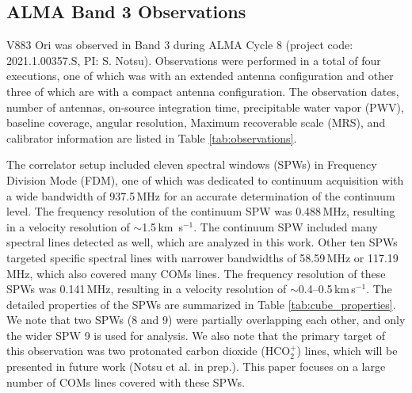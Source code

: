 \documentclass[linenumbers, twocolumn, twocolappendix, astrosymb, times]{aastex631}
\newcommand{\hcotp}{HCO$_2^+$}
\begin{document}
\subsection{ALMA Band 3 Observations}
V883 Ori was observed in Band 3 during ALMA Cycle 8 (project code: 2021.1.00357.S, PI: S. Notsu). Observations were performed in a total of four executions, one of which was with an extended antenna configuration and other three of which are with a compact antenna configuration. The observation dates, number of antennas, on-source integration time, precipitable water vapor (PWV), baseline coverage, angular resolution, Maximum recoverable scale (MRS), and calibrator information are listed in Table \ref{tab:observations}. 

The correlator setup included eleven spectral windows (SPWs) in Frequency Division Mode (FDM), one of which was dedicated to continuum acquisition with a wide bandwidth of 937.5\,MHz for an accurate determination of the continuum level. The frequency resolution of the continuum SPW was 0.488\,MHz, resulting in a velocity resolution of $\sim$1.5\,km \,s$^{-1}$. The continuum SPW included many spectral lines detected as well, which are analyzed in this work. Other ten SPWs targeted specific spectral lines with narrower bandwidths of 58.59\,MHz or 117.19\,MHz, which also covered many COMs lines. The frequency resolution of these SPWs was 0.141\,MHz, resulting in a velocity resolution of $\sim$0.4--0.5\,km\,s$^{-1}$. 
The detailed properties of the SPWs are summarized in Table \ref{tab:cube_properties}. We note that two SPWs (8 and 9) were partially overlapping each other, and only the wider SPW 9 is used for analysis. We also note that the primary target of this observation was two protonated carbon dioxide (\hcotp) lines, which will be presented in future work (Notsu et al. in prep.). This paper focuses on a large number of COMs lines covered with these SPWs.
\end{document}
